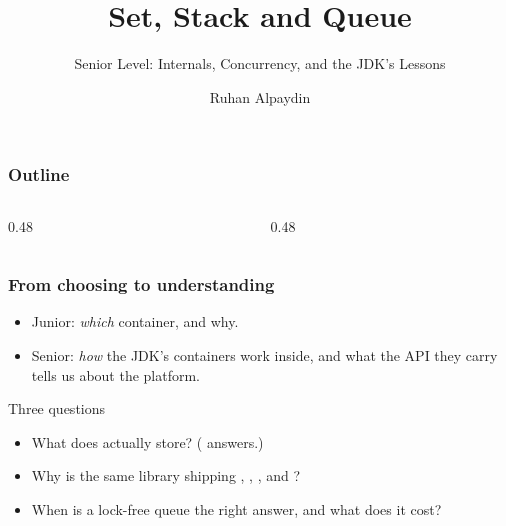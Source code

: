 \documentclass[aspectratio=169,10pt,compress]{beamer}
\title{Set, Stack and Queue}
\subtitle{Senior Level: Internals, Concurrency, and the JDK's Lessons}
\author[Bingol]{Ruhan Alpaydin}
\institute[FCIS]{
    Faculty of Computer and Information Sciences\\
    Yeditepe University
}
\date{
	{\tiny \hbTimeStamp}
}
\begin{document}
\begin{frame}[t,fragile]
  \titlepage
\end{frame}




\begin{frame}[t,fragile] \frametitle{Outline}
  \begin{columns}[T]
    \begin{column}{0.48\textwidth}
      \tableofcontents[sections={1-4}, hideallsubsections]
    \end{column}
    \begin{column}{0.48\textwidth}
      \tableofcontents[sections={5-8}, hideallsubsections]
    \end{column}
  \end{columns}
\end{frame}





\begin{frame}[t,fragile] \frametitle{From choosing to understanding}
  \begin{itemize}
    \item Junior: \emph{which} container, and why.
    \item Senior: \emph{how} the JDK's containers work inside, and
          what the API they carry tells us about the platform.
  \end{itemize}
  \begin{block}{Three questions}
    \small
    \begin{itemize}
      \item What does  actually store?
            ( answers.)
      \item Why is the same library shipping
            , , , and
            ?
      \item When is a lock-free queue the right answer,
            and what does it cost?
    \end{itemize}
  \end{block}
\end{frame}
\end{document}
